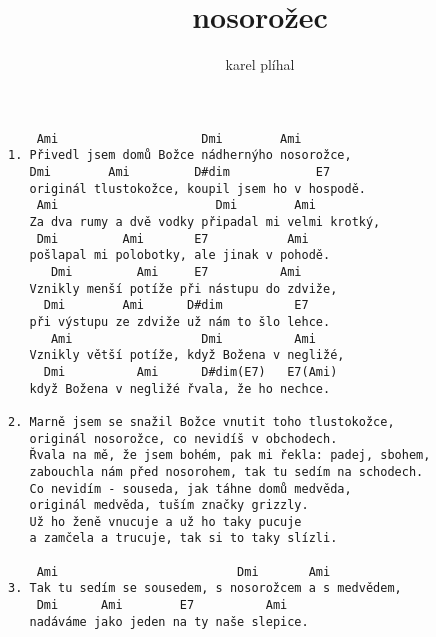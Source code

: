 \author{karel plíhal}
\title{nosorožec}
\maketitle
\begin{verbatim}
    Ami                    Dmi        Ami
1. Přivedl jsem domů Božce nádhernýho nosorožce,
   Dmi        Ami         D#dim            E7
   originál tlustokožce, koupil jsem ho v hospodě.
    Ami                      Dmi        Ami
   Za dva rumy a dvě vodky připadal mi velmi krotký,
    Dmi         Ami       E7           Ami
   pošlapal mi polobotky, ale jinak v pohodě.
      Dmi         Ami     E7          Ami
   Vznikly menší potíže při nástupu do zdviže,
     Dmi        Ami      D#dim          E7
   při výstupu ze zdviže už nám to šlo lehce.
      Ami                  Dmi          Ami
   Vznikly větší potíže, když Božena v negližé,
     Dmi          Ami      D#dim(E7)   E7(Ami)
   když Božena v negližé řvala, že ho nechce.

2. Marně jsem se snažil Božce vnutit toho tlustokožce,
   originál nosorožce, co nevidíš v obchodech.
   Řvala na mě, že jsem bohém, pak mi řekla: padej, sbohem,
   zabouchla nám před nosorohem, tak tu sedím na schodech.
   Co nevidím - souseda, jak táhne domů medvěda,
   originál medvěda, tuším značky grizzly.
   Už ho ženě vnucuje a už ho taky pucuje
   a zamčela a trucuje, tak si to taky slízli.

    Ami                         Dmi       Ami
3. Tak tu sedím se sousedem, s nosorožcem a s medvědem,
    Dmi      Ami        E7          Ami
   nadáváme jako jeden na ty naše slepice.
\end{verbatim}